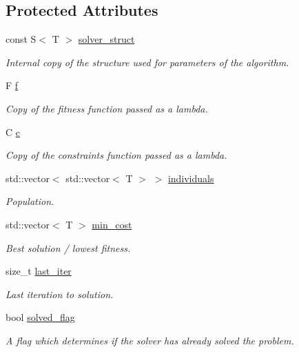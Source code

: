 \subsection*{Protected Attributes}
\begin{DoxyCompactItemize}
\item 
const S$<$ T $>$ \hyperlink{classea_1_1_solver__base_a5e1d821809f2d26c6f882942ad728127}{solver\+\_\+struct}
\begin{DoxyCompactList}\small\item\em Internal copy of the structure used for parameters of the algorithm. \end{DoxyCompactList}\item 
F \hyperlink{classea_1_1_solver__base_ae0a893780c93dfe17c1d17301de6494f}{f}
\begin{DoxyCompactList}\small\item\em Copy of the fitness function passed as a lambda. \end{DoxyCompactList}\item 
C \hyperlink{classea_1_1_solver__base_a6914e89d30e7484f2b4af1783f0de8c3}{c}
\begin{DoxyCompactList}\small\item\em Copy of the constraints function passed as a lambda. \end{DoxyCompactList}\item 
std\+::vector$<$ std\+::vector$<$ T $>$ $>$ \hyperlink{classea_1_1_solver__base_ad75bc440d24a46e97694c7c889f2ecde}{individuals}
\begin{DoxyCompactList}\small\item\em Population. \end{DoxyCompactList}\item 
std\+::vector$<$ T $>$ \hyperlink{classea_1_1_solver__base_af745cded954be26280d842c1e7c7f989}{min\+\_\+cost}
\begin{DoxyCompactList}\small\item\em Best solution / lowest fitness. \end{DoxyCompactList}\item 
size\+\_\+t \hyperlink{classea_1_1_solver__base_a8f9a321eb87e57636cf0b0f3a57b6fc2}{last\+\_\+iter}
\begin{DoxyCompactList}\small\item\em Last iteration to solution. \end{DoxyCompactList}\item 
bool \hyperlink{classea_1_1_solver__base_a1cdb824e8df6d4a8f228820ea85c9b05}{solved\+\_\+flag}
\begin{DoxyCompactList}\small\item\em A flag which determines if the solver has already solved the problem. \end{DoxyCompactList}\item 

\end{DoxyCompactItemize}
